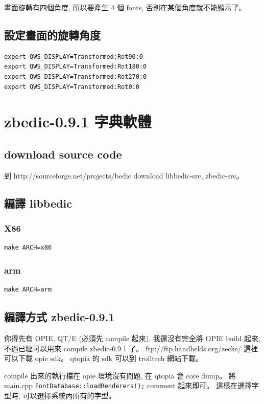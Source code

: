 \documentclass[12pt,a4paper]{article}
\begin{document}
\begin{CJK}{UTF8}{cwmu}
畫面旋轉有四個角度, 所以要產生 4 個 fonts, 否則在某個角度就不能顯示了。

\subsection{設定畫面的旋轉角度}
\begin{verbatim}
export QWS_DISPLAY=Transformed:Rot90:0
export QWS_DISPLAY=Transformed:Rot180:0
export QWS_DISPLAY=Transformed:Rot270:0
export QWS_DISPLAY=Transformed:Rot0:0
\end{verbatim}

\section{zbedic-0.9.1 字典軟體}
\subsection{download source code}
到 http://sourceforge.net/projects/bedic download libbedic-src, zbedic-src。


\subsection{編譯 libbedic}
\subsubsection{X86}
\begin{verbatim}
make ARCH=x86
\end{verbatim}
\subsubsection{arm}
\begin{verbatim}
make ARCH=arm
\end{verbatim}


\subsection{編譯方式 zbedic-0.9.1}
你得先有 OPIE, QT/E (必須先 compile 起來),
我還沒有完全將 OPIE build 起來, 
不過已經可以用來 compile zbedic-0.9.1 了。
ftp://ftp.handhelds.org/zecke/ 這裡可以下載 opie sdk。
qtopia 的 sdk 可以到 trolltech 網站下載。

compile 出來的執行檔在 opie 環境沒有問題, 在 qtopia 會 core dump。
將 main.cpp \verb+FontDatabase::loadRenderers();+
comment 起來即可。
這樣在選擇字型時, 可以選擇系統內所有的字型。


\end{CJK}
\end{document}
